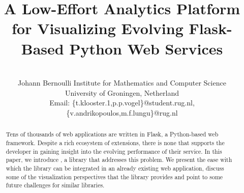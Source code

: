 \documentclass[conference]{IEEEtran}
\begin{document}
%
\title{A Low-Effort Analytics Platform for Visualizing Evolving Flask-Based Python Web Services}



\author{
\\
Johann Bernoulli Institute for Mathematics and Computer Science\\
University of Groningen, Netherland\\
Email: \{t.klooster.1,p.p.vogel\}@student.rug.nl, \{v.andrikopoulos,m.f.lungu\}@rug.nl 
}

\maketitle

\begin{abstract}

  Tens of thousands of web applications are written in Flask, a Python-based web framework. Despite a rich ecosystem of extensions, there is none that supports the developer in gaining insight into the evolving performance of their service. In this paper, we introduce \tool, a library that addresses this problem. We present the ease with which the library can be integrated in an already existing web application, discuss some of the visualization perspectives that the library provides and point to some future challenges for similar libraries.

\end{abstract}
\end{document}
